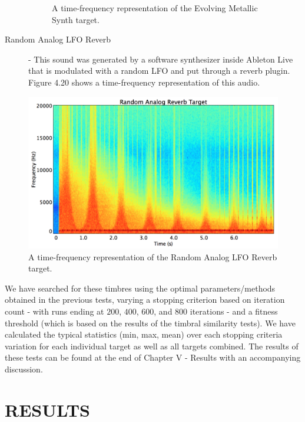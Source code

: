 \documentclass[12pt]{report} 	%
\numberwithin{figure}{chapter}
\numberwithin{table}{chapter}
\numberwithin{equation}{chapter}
\begin{document}
\begin{flushleft}
\begin{description}
\begin{figure}[h!]
\begin{center}
\caption[Evolving metallic synth time-frequency representation]{A time-frequency representation of the Evolving Metallic Synth target.}
\end{center}
\end{figure}
\item[Random Analog LFO Reverb] - This sound was generated by a software synthesizer inside Ableton Live that is modulated with a random LFO and put through a reverb plugin. Figure 4.20 shows a time-frequency representation of this audio.
\end{description}
\begin{figure}[h!]
\begin{center}
\includegraphics[scale=0.35,width=\linewidth]{RandomAnalogReverbTargetSTFT}
\caption[Random analog LFO reverb time-frequency representation]{A time-frequency representation of the Random Analog LFO Reverb target.}
\end{center}
\end{figure}
We have searched for these timbres using the optimal parameters/methods obtained in the previous tests, varying a stopping criterion based on iteration count - with runs ending at $200$, $400$, $600$, and $800$ iterations - and a fitness threshold (which is based on the results of the timbral similarity tests). We have calculated the typical statistics (min, max, mean) over each stopping criteria variation for each individual target as well as all targets combined. The results of these tests can be found at the end of Chapter V - Results with an accompanying discussion.

\vspace*{\QuarterPage}
\chapter{RESULTS} %

\end{flushleft}
\end{document}
